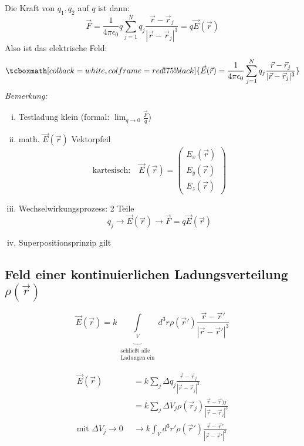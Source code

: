 \documentclass[titlepage,11pt,a4paper,ngerman]{report}
\newcommand{\tx}[1]{\textrm{#1}}
\newcommand{\rmbox}[1]{\tcboxmath[colback=white,colframe=red!75!black]{#1}}
\begin{document}

Die Kraft von $ q_1,q_2 $ auf $ q $ ist dann:
\begin{equation*}
\vec{F} = \frac{1}{4 \pi \epsilon_0} q \sum\limits^{N}_{j=1} q_j \frac{\vec{r} - \vec{r}_j}{|\vec{r} - \vec{r}_j|^3} = q \vec{E}(\vec{r})
\end{equation*}
Also ist das elektrische Feld:
\begin{equation*}
\rmbox{\vec{E}(\vec{r}) = \frac{1}{4 \pi \epsilon_0} \sum\limits_{j=1}^{N} q_j \frac{\vec{r} - \vec{r}_j}{|\vec{r} - \vec{r}_j|^3}}
\end{equation*}
\emph{Bemerkung:}
\begin{enumerate}[i)]
	\item Testladung klein (formal: $ \lim_{q\to0}\frac{\vec{F}}{q} $)
	\item math. $ \vec{E}(\vec{r}) $ Vektorpfeil\\
	\begin{equation*}
	\tx{kartesisch:} \quad \vec{E}(\vec{r}) = \begin{pmatrix}
	E_x(\vec{r}) \\ E_y(\vec{r}) \\ E_z(\vec{r})
	\end{pmatrix}
	\end{equation*}
	\item Wechselwirkungsprozess: 2 Teile
	\begin{equation*}
	q_j \rightarrow \vec{E}(\vec{r}) \rightarrow \vec{F} = q \vec{E} (\vec{r})
	\end{equation*}
	\item Superpositionsprinzip gilt
\end{enumerate}
\subsection{Feld einer kontinuierlichen Ladungsverteilung $ \rho(\vec{r}) $}
\begin{equation*}
\vec{E}(\vec{r}) = k \underbrace{\int\limits_V}_{\substack{\tx{schließt alle} \\ \tx{Ladungen ein}}} d^3 r \rho(\vec{r}') \frac{\vec{r} - \vec{r}'}{|\vec{r} - \vec{r}'|^3}
\end{equation*}


\begin{align*}
\vec{E}(\vec{r}) &= k\sum_j\Delta q_j\frac{\vec{r}-\vec{r}_j}{|\vec{r}-\vec{r}_j|^3}\\
&= k\sum_j\Delta V_j\rho(\vec{r}_j)\frac{\vec{r}-\vec{r})j}{|\vec{r}-\vec  {r}_j|^3}\\
\scriptstyle{\tx{mit } \Delta V_j \to 0}\ \ &\rightarrow k\int_V d^3r'\rho(\vec{r}')\frac{\vec{r}-\vec{r}'}{|\vec{r}  -\vec{r}'|^3}
\end{align*}


%
%
\end{document}
